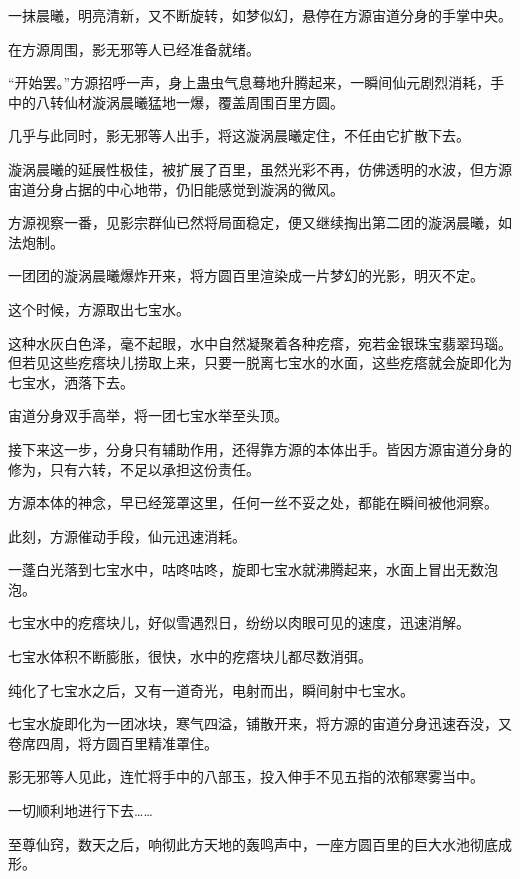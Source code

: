 
\begin{this_body}

一抹晨曦，明亮清新，又不断旋转，如梦似幻，悬停在方源宙道分身的手掌中央。

在方源周围，影无邪等人已经准备就绪。

“开始罢。”方源招呼一声，身上蛊虫气息蓦地升腾起来，一瞬间仙元剧烈消耗，手中的八转仙材漩涡晨曦猛地一爆，覆盖周围百里方圆。

几乎与此同时，影无邪等人出手，将这漩涡晨曦定住，不任由它扩散下去。

漩涡晨曦的延展性极佳，被扩展了百里，虽然光彩不再，仿佛透明的水波，但方源宙道分身占据的中心地带，仍旧能感觉到漩涡的微风。

方源视察一番，见影宗群仙已然将局面稳定，便又继续掏出第二团的漩涡晨曦，如法炮制。

一团团的漩涡晨曦爆炸开来，将方圆百里渲染成一片梦幻的光影，明灭不定。

这个时候，方源取出七宝水。

这种水灰白色泽，毫不起眼，水中自然凝聚着各种疙瘩，宛若金银珠宝翡翠玛瑙。但若见这些疙瘩块儿捞取上来，只要一脱离七宝水的水面，这些疙瘩就会旋即化为七宝水，洒落下去。

宙道分身双手高举，将一团七宝水举至头顶。

接下来这一步，分身只有辅助作用，还得靠方源的本体出手。皆因方源宙道分身的修为，只有六转，不足以承担这份责任。

方源本体的神念，早已经笼罩这里，任何一丝不妥之处，都能在瞬间被他洞察。

此刻，方源催动手段，仙元迅速消耗。

一蓬白光落到七宝水中，咕咚咕咚，旋即七宝水就沸腾起来，水面上冒出无数泡泡。

七宝水中的疙瘩块儿，好似雪遇烈日，纷纷以肉眼可见的速度，迅速消解。

七宝水体积不断膨胀，很快，水中的疙瘩块儿都尽数消弭。

纯化了七宝水之后，又有一道奇光，电射而出，瞬间射中七宝水。

七宝水旋即化为一团冰块，寒气四溢，铺散开来，将方源的宙道分身迅速吞没，又卷席四周，将方圆百里精准罩住。

影无邪等人见此，连忙将手中的八部玉，投入伸手不见五指的浓郁寒雾当中。

一切顺利地进行下去……

至尊仙窍，数天之后，响彻此方天地的轰鸣声中，一座方圆百里的巨大水池彻底成形。


\end{this_body}
